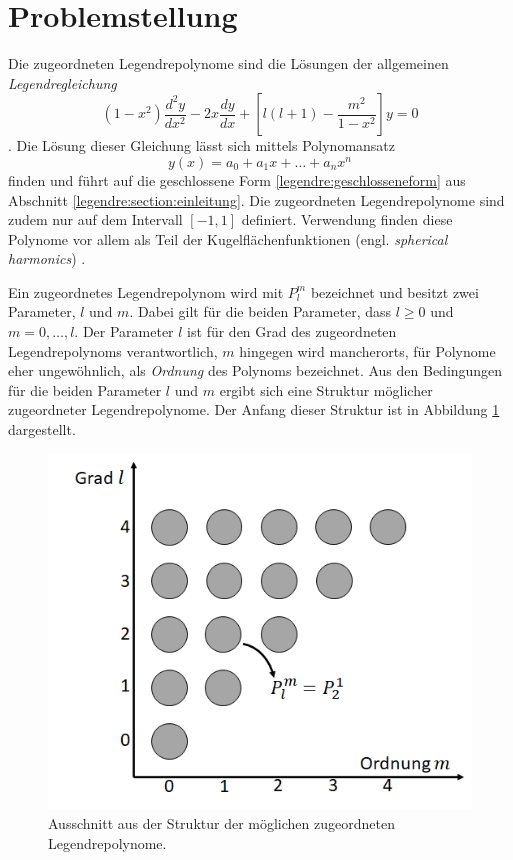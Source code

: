 %
%
%
\section{Problemstellung
\label{legendre:section:problemstellung}}
Die zugeordneten Legendrepolynome sind die Lösungen der allgemeinen {\em Legendregleichung}
\begin{equation}
(1-x^2) \frac{d^2y}{dx^2}
-2x \frac{dy}{dx}
+ \left[ l(l+1)- \frac{m^2}{1-x^2} \right] y
=0
\label{legendre:legendregleichung}
\end{equation}
\cite{legendre:assoc-legendre-poly-wolfram} \cite{legendre:assoc-legendre-diff-wolfram}.
Die Lösung dieser Gleichung lässt sich mittels Polynomansatz
\begin{equation}
y(x)=a_0+a_1x+ \ldots + a_nx^n
\label{legendre:polynomansatz}
\end{equation}
finden und führt auf die geschlossene Form \eqref{legendre:geschlosseneform} aus Abschnitt \ref{legendre:section:einleitung}.
Die zugeordneten Legendrepolynome sind zudem nur auf dem Intervall $[-1, 1]$ definiert.
Verwendung finden diese Polynome vor allem als Teil der Kugelflächenfunktionen (engl. {\em spherical harmonics}) \cite{legendre:spherical-harmonic-wolfram}.

Ein zugeordnetes Legendrepolynom wird mit $P^m_l$ bezeichnet und besitzt zwei Parameter, $l$ und $m$.
Dabei gilt für die beiden Parameter, dass $l\geq 0$ und $m=0, \ldots , l$.
Der Parameter $l$ ist für den Grad des zugeordneten Legendrepolynoms verantwortlich, $m$ hingegen wird mancherorts, für Polynome eher ungewöhnlich, als {\em Ordnung} des Polynoms bezeichnet.
Aus den Bedingungen für die beiden Parameter $l$ und $m$ ergibt sich eine Struktur möglicher zugeordneter Legendrepolynome.
Der Anfang dieser Struktur ist in Abbildung \ref{legendre:fig:struktur} dargestellt.
\begin{figure}[!ht]
\centering
\includegraphics[width=0.6\linewidth]{papers/legendre/plots/legendre_struktur}
\caption{Ausschnitt aus der Struktur der möglichen zugeordneten Legendrepolynome.}
\label{legendre:fig:struktur}
\end{figure}

